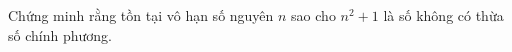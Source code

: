 \ifshowproblem
\begin{problem}\label{example:CHN-2015-TST2-P6}
	Chứng minh rằng tồn tại vô hạn số nguyên $n$ sao cho $n^2 + 1$ là số không có thừa số chính phương.
\end{problem}
\fi

\footnotemark
{}
\fi